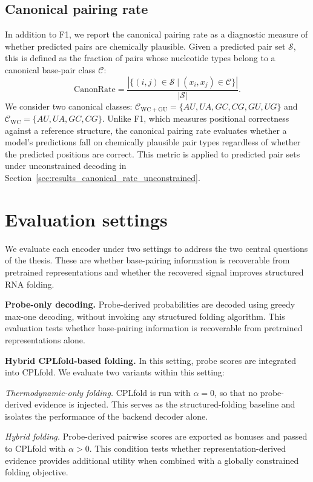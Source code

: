 \documentclass[logo,bsc,singlespacing,parskip]{infthesis}
\begin{document}
\subsection{Canonical pairing rate}
\label{sec:methods_metrics_canon}
In addition to F1, we report the canonical pairing rate as a
diagnostic measure of whether predicted pairs are chemically plausible.
Given a predicted pair set $\mathcal{S}$, this is defined as the
fraction of pairs whose nucleotide types belong to a canonical
base-pair class $\mathcal{C}$:
\[
\mathrm{CanonRate}
= \frac{|\{(i,j)\in\mathcal{S} \mid (x_i,x_j)\in\mathcal{C}\}|}
       {|\mathcal{S}|}.
\]
We consider two canonical classes:
$\mathcal{C}_{\mathrm{WC{+}GU}}=\{AU,UA,GC,CG,GU,UG\}$ and
$\mathcal{C}_{\mathrm{WC}}=\{AU,UA,GC,CG\}$. Unlike F1, which
measures positional correctness against a reference structure, the
canonical pairing rate evaluates whether a model's predictions fall on
chemically plausible pair types regardless of whether the predicted
positions are correct. This metric is applied to predicted pair sets
under unconstrained decoding in
Section~\ref{sec:results_canonical_rate_unconstrained}.

\section{Evaluation settings}
\label{sec:exp_conditions}
We evaluate each encoder under two settings to address the two central questions of the thesis. These are whether base-pairing information is recoverable from pretrained representations and whether the recovered signal improves structured RNA folding.

\textbf{Probe-only decoding.}
Probe-derived probabilities are decoded using greedy max-one
decoding, without invoking any structured folding algorithm. This
evaluation tests whether base-pairing information is recoverable
from pretrained representations alone.

\textbf{Hybrid CPLfold-based folding.}
In this setting, probe scores are integrated into CPLfold. We evaluate two variants within this setting:

\emph{Thermodynamic-only folding.}
CPLfold is run with $\alpha = 0$, so that no probe-derived evidence is
injected. This serves as the structured-folding baseline and isolates
the performance of the backend decoder alone.

\emph{Hybrid folding.}
Probe-derived pairwise scores are exported as bonuses and passed to
CPLfold with $\alpha > 0$. This condition tests whether
representation-derived evidence provides additional utility when
combined with a globally constrained folding objective.
\end{document}
